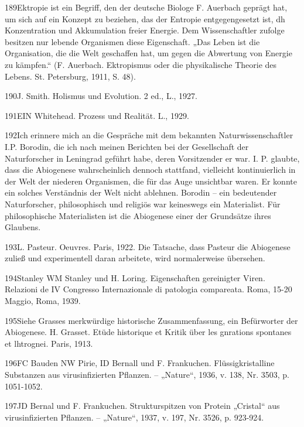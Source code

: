 \documentclass[11pt,a4paper]{book}
\begin{document}
189Ektropie ist ein Begriff, den der deutsche Biologe F. Auerbach geprägt hat, um sich auf ein Konzept zu beziehen, das der Entropie entgegengesetzt ist, dh Konzentration und Akkumulation freier Energie. Dem Wissenschaftler zufolge besitzen nur lebende Organismen diese Eigenschaft. „Das Leben ist die Organisation, die die Welt geschaffen hat, um gegen die Abwertung von Energie zu kämpfen.“ (F. Auerbach. Ektropismus oder die physikalische Theorie des Lebens. St. Petersburg, 1911, S. 48).



190J. Smith. Holismus und Evolution. 2 ed., L., 1927.



191EIN Whitehead. Prozess und Realität. L., 1929.



192Ich erinnere mich an die Gespräche mit dem bekannten Naturwissenschaftler I.P. Borodin, die ich nach meinen Berichten bei der Gesellschaft der Naturforscher in Leningrad geführt habe, deren Vorsitzender er war. I. P. glaubte, dass die Abiogenese wahrscheinlich dennoch stattfand, vielleicht kontinuierlich in der Welt der niederen Organismen, die für das Auge unsichtbar waren. Er konnte ein solches Verständnis der Welt nicht ablehnen. Borodin -- ein bedeutender Naturforscher, philosophisch und religiös war keineswegs ein Materialist. Für philosophische Materialisten ist die Abiogenese einer der Grundsätze ihres Glaubens.



193L. Pasteur. Oeuvres. Paris, 1922. Die Tatsache, dass Pasteur die Abiogenese zuließ und experimentell daran arbeitete, wird normalerweise übersehen.



194Stanley WM Stanley und H. Loring. Eigenschaften gereinigter Viren. Relazioni de IV Congresso Internazionale di patologia compareata. Roma, 15-20 Maggio, Roma, 1939.



195Siehe Grasses merkwürdige historische Zusammenfassung, ein Befürworter der Abiogenese. H. Grasset. Etüde historique et Kritik über les gnrations spontanes et lhtrognei. Paris, 1913.



196FC Bauden NW Pirie, ID Bernall und F. Frankuchen. Flüssigkristalline Substanzen aus virusinfizierten Pflanzen. -- „Nature“, 1936, v. 138, Nr. 3503, p. 1051-1052.



197JD Bernal und F. Frankuchen. Strukturspitzen von Protein „Cristal“ aus virusinfizierten Pflanzen. -- „Nature“, 1937, v. 197, Nr. 3526, p. 923-924.
\end{document}
